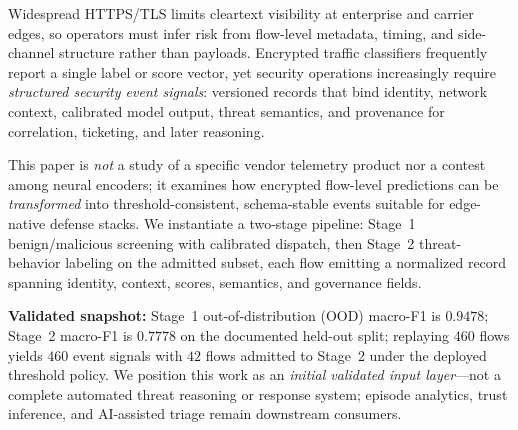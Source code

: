 Widespread HTTPS/TLS limits cleartext visibility at enterprise and carrier edges, so operators must infer risk from flow-level metadata, timing, and side-channel structure rather than payloads.
Encrypted traffic classifiers frequently report a single label or score vector, yet security operations increasingly require \emph{structured security event signals}: versioned records that bind identity, network context, calibrated model output, threat semantics, and provenance for correlation, ticketing, and later reasoning.

This paper is \emph{not} a study of a specific vendor telemetry product nor a contest among neural encoders; it examines how encrypted flow-level predictions can be \emph{transformed} into threshold-consistent, schema-stable events suitable for edge-native defense stacks.
We instantiate a two-stage pipeline: Stage~1 benign/malicious screening with calibrated dispatch, then Stage~2 threat-behavior labeling on the admitted subset, each flow emitting a normalized record spanning identity, context, scores, semantics, and governance fields.

\textbf{Validated snapshot:} Stage~1 out-of-distribution (OOD) macro-F1 is $0.9478$; Stage~2 macro-F1 is $0.7778$ on the documented held-out split; replaying $460$ flows yields $460$ event signals with $42$ flows admitted to Stage~2 under the deployed threshold policy.
We position this work as an \emph{initial validated input layer}---not a complete automated threat reasoning or response system; episode analytics, trust inference, and AI-assisted triage remain downstream consumers.
